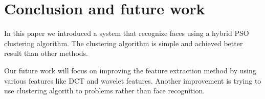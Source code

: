 \documentclass[a4paper,twoside]{article}
\begin{document}
\section{Conclusion and future work}
\label{sec:Conclusion}
In this paper we introduced a system that recognize faces using a hybrid PSO clustering algorithm. The clustering algorithm is simple and achieved better result than other methods.


Our future work will focus on improving the feature extraction method by using various features like DCT and wavelet features. Another improvement is trying to use clustering algorith to problems rather than face recognition. 


%
%
%


\end{document}
